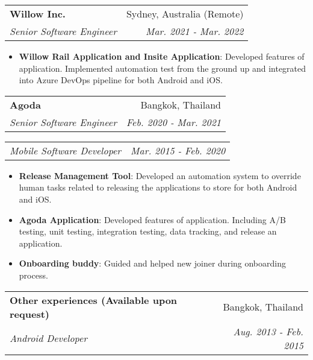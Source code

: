 \documentclass[A4,11pt]{article}
\makeatletter
\newcommand{\resumeItem}[2]{
  \item\small{
    \textbf{#1}{: #2 \vspace{-2pt}}
  }
}
\newcommand{\resumeSubheading}[4]{
  \vspace{-1pt}\item
    \begin{tabular*}{0.97\textwidth}[t]{l@{\extracolsep{\fill}}r}
      \textbf{#1} & #2 \\
      \textit{\small#3} & \textit{\small #4} \\
    \end{tabular*}\vspace{-5pt}
}
\newcommand{\resumeSubSubheading}[2]{
    \begin{tabular*}{0.97\textwidth}{l@{\extracolsep{\fill}}r}
      \textit{\small#1} & \textit{\small #2} \\
    \end{tabular*}\vspace{-5pt}
}
\newcommand{\resumeItemListStart}{\begin{itemize}}
\newcommand{\resumeItemListEnd}{\end{itemize}\vspace{-5pt}}
\makeatother
\begin{document}
    \resumeSubheading
      {Willow Inc.}{Sydney, Australia (Remote)}
      {Senior Software Engineer}{Mar. 2021 - Mar. 2022}
      \resumeItemListStart
        \resumeItem{Willow Rail Application and Insite Application}
          {Developed features of application. Implemented automation test from the ground up and integrated into Azure DevOps pipeline for both Android and iOS.}
        \resumeItemListEnd

    \resumeSubheading
      {Agoda}{Bangkok, Thailand}
      {Senior Software Engineer}{Feb. 2020 - Mar. 2021}

    \resumeSubSubheading
      {Mobile Software Developer}{Mar. 2015 - Feb. 2020}
      \resumeItemListStart
        \resumeItem{Release Management Tool}
          {Developed an automation system to override human tasks related to releasing the applications to store for both Android and iOS.}
        \resumeItem{Agoda Application}
          {Developed features of application. Including A/B testing, unit testing, integration testing, data tracking, and release an application.}
        \resumeItem{Onboarding buddy}
          {Guided and helped new joiner during onboarding process.}

      \resumeItemListEnd

    \resumeSubheading
      {Other experiences (Available upon request)}{Bangkok, Thailand}
      {Android Developer}{Aug. 2013 - Feb. 2015}
\end{document}
